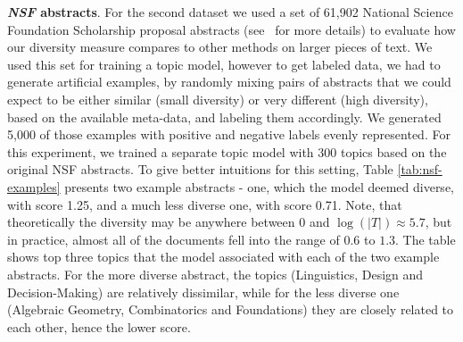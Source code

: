 
{\bf {\em NSF} abstracts}. For the second dataset we used a set of
61,902 National Science Foundation 
Scholarship proposal abstracts (see~\cite{bache:2013} for more
details) to evaluate how our diversity measure 
compares to other methods on larger pieces of text. We used this set
for training a topic model, however to get labeled data, we had to
generate artificial examples, by randomly mixing pairs of abstracts that we
could expect to be either similar (small diversity) or very different
(high diversity), based on the available meta-data, and labeling them accordingly. We generated 5,000 of
those examples with positive and negative labels evenly
represented. For this experiment, we trained a separate topic model with $300$ topics
based on the original NSF abstracts. To give better intuitions for
this setting, Table \ref{tab:nsf-examples} presents two example
abstracts - one, which the model deemed diverse, with score 1.25, and
a much less diverse one, with score 0.71. Note, that theoretically the
diversity may be anywhere between $0$ and $\log(|T|)\approx 5.7$, but
in practice, almost all of the documents fell into the range of $0.6$
to $1.3$. The table shows top three topics that the model associated
with each of the two example abstracts. For the more diverse abstract, the
topics (Linguistics, Design and Decision-Making) are relatively dissimilar,
while for the less diverse one (Algebraic Geometry, Combinatorics and
Foundations) they are closely related to each other, hence the lower score.  

